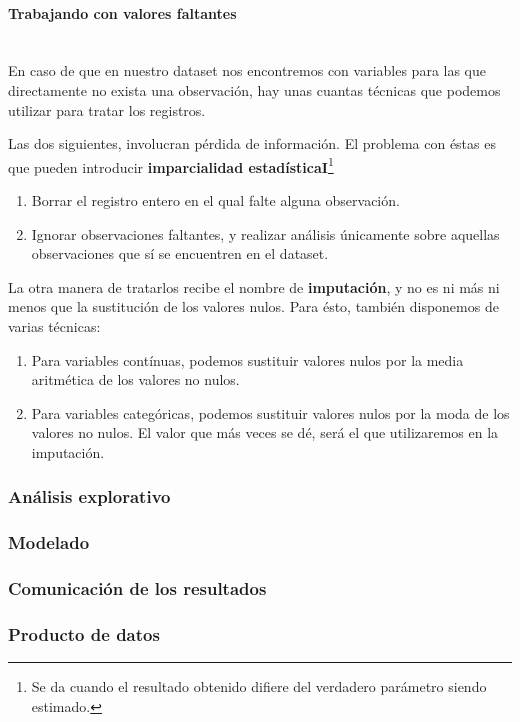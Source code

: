 \paragraph{Trabajando con valores faltantes} \mbox{}\\

En caso de que en nuestro dataset nos encontremos con variables para las que
directamente no exista una observación, hay unas cuantas técnicas que podemos
utilizar para tratar los registros.

Las dos siguientes, involucran pérdida de información. El problema con éstas es
que pueden introducir \textbf{imparcialidad estadísticaI}\footnote{Se da cuando
  el resultado obtenido difiere del verdadero parámetro siendo estimado.}

\begin{enumerate}
\item Borrar el registro entero en el qual falte alguna observación.
\item Ignorar observaciones faltantes, y realizar análisis únicamente sobre
  aquellas observaciones que sí se encuentren en el dataset.
\end{enumerate}

La otra manera de tratarlos recibe el nombre de \textbf{imputación}, y no es ni
más ni menos que la sustitución de los valores nulos. Para ésto, también
disponemos de varias técnicas:

\begin{enumerate}
\item Para variables contínuas, podemos sustituir valores nulos por la media
  aritmética de los valores no nulos.
\item Para variables categóricas, podemos sustituir valores nulos por la moda de
  los valores no nulos. El valor que más veces se dé, será el que utilizaremos
  en la imputación.
\end{enumerate}




\subsubsection{Análisis explorativo}
\label{subsec:state_dataScience_workflow_2}

\subsubsection{Modelado}
\label{subsec:state_dataScience_workflow_modeling}

\subsubsection{Comunicación de los resultados}
\label{subsec:state_dataScience_workflow_communication}

\subsubsection{Producto de datos}
\label{subsec:state_dataScience_workflow_dataProduct}





